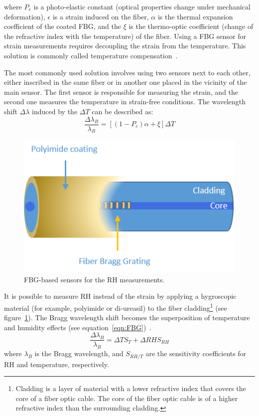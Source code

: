 where $P_{e}$ is a photo-elastic constant (optical properties change under mechanical deformation), $\epsilon$ is a strain induced on the fiber, $\alpha$ is the thermal expansion coefficient of the coated \gls{FBG}, and the $\xi$ is the thermo-optic coefficient (change of the refractive index with the temperature) of the fiber. Using a \gls{FBG} sensor for strain measurements requires decoupling the strain from the temperature. This solution is commonly called temperature compensation~\cite{Yun-Jiang_Rao_1997}. 

The most commonly used solution involves using two sensors next to each other, either inscribed in the same fiber or in another one placed in the vicinity of the main sensor. The first sensor is responsible for measuring the strain, and the second one measures the temperature in strain-free conditions. The wavelength shift $\Delta \lambda$ induced by the $\Delta T$ can be described as:
\begin{equation}
    \frac{\Delta\lambda_{B}}{\lambda_{B}}=\left [(1-P_{e}) \alpha + \xi  \right ] \Delta T
\end{equation}


\begin{figure}[!h]
\centering
\includegraphics[width=0.45\columnwidth]{Chapter5/images/Picture1.png}
\caption{FBG-based sensors for the RH measurements.}
\label{fig:fbg_scheme}
\end{figure}


It is possible to measure RH instead of the strain by applying a hygroscopic material (for example, polyimide or di-ureasil) to the fiber cladding\footnote{Cladding is a layer of material with a lower refractive index that covers the core of a fiber optic cable. The core of the fiber optic cable is of a higher refractive index than the surrounding cladding.} (see figure~\ref{fig:fbg_scheme}). The Bragg wavelength shift becomes the superposition of temperature and humidity effects (see equation~\ref{eqn:FBG})~\cite{Kronenberg:02, YEO_PI}. 
                             \begin{equation}\label{eqn:FBG}
                                    \frac{\Delta\lambda_{B}}{\lambda_{B}}=\Delta TS_{T}+\Delta RHS_{RH}
                            \end{equation}
                            where $\lambda_{B}$ is the Bragg wavelength, and $S_{RH/T}$ are the sensitivity coefficients for RH and temperature, respectively. 

